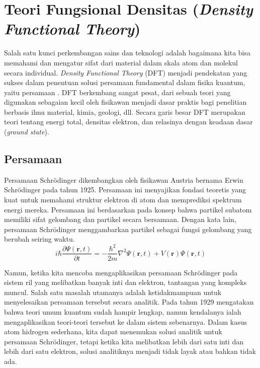 \section{Teori Fungsional Densitas (\textit{Density Functional Theory})}
Salah satu kunci perkembangan sains dan teknologi adalah bagaimana kita bisa memahami dan mengatur sifat dari material dalam skala atom dan molekul secara individual. \textit{Density Functional Theory} (DFT) menjadi pendekatan yang sukses dalam penentuan solusi persamaan fundamental dalam fisika kuantum, yaitu persamaan \schro. DFT berkembang sangat pesat, dari sebuah teori yang digunakan sebagaian kecil oleh fisikawan menjadi dasar praktis bagi penelitian berbasis ilmu material, kimia, geologi, dll. Secara garis besar DFT merupakan teori tentang energi total, densitas elektron, dan relasinya dengan keadaan dasar (\textit{ground state}).

\subsection{Persamaan \schro}
Persamaan Schrödinger dikembangkan oleh fisikawan Austria bernama Erwin Schrödinger pada tahun 1925. Persamaan ini menyajikan fondasi teoretis yang kuat untuk memahami struktur elektron di atom dan memprediksi spektrum energi mereka. Persamaan ini berdasarkan pada konsep bahwa partikel subatom memiliki sifat gelombang dan partikel secara bersamaan. Dengan kata lain, persamaan Schrödinger menggambarkan partikel sebagai fungsi gelombang yang berubah seiring waktu. 
\begin{equation}
i\hbar \frac{\partial \Psi(\mathbf{r}, t)}{\partial t} = -\frac{\hbar^2}{2m} \nabla^2 \Psi(\mathbf{r}, t) + V(\mathbf{r})\Psi(\mathbf{r}, t)
\end{equation}

Namun, ketika kita mencoba mengaplikasikan persamaan Schrödinger pada sistem ril yang melibatkan banyak inti dan elektron, tantangan yang kompleks muncul. Salah satu masalah utamanya adalah ketidakmampuan untuk menyelesaikan persamaan tersebut secara analitik. Pada tahun 1929 \citeauthor{dirac1929quantum} mengatakan bahwa teori umum kuantum sudah hampir lengkap, namun kendalanya ialah mengaplikasikan teori-teori tersebut ke dalam sistem sebenarnya. Dalam kasus atom hidrogen sederhana, kita dapat menemukan solusi analitik untuk persamaan Schrödinger, tetapi ketika kita melibatkan lebih dari satu inti dan lebih dari satu elektron, solusi analitiknya menjadi tidak layak atau bahkan tidak ada.

